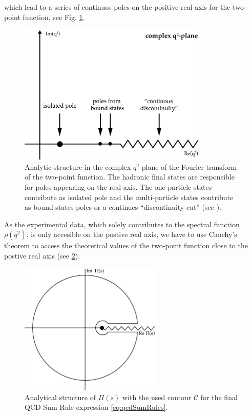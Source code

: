 \documentclass[../../index.tex]{subfiles}
\begin{document}
which lead to a series of continuos poles on the positive real axis for the
two-point function, see Fig. \ref{fig:analyticStructureCorrelator}.
\begin{figure}[h]
  \centering
  \label{fig:analyticStructureCorrelator}
  \includegraphics[width=0.8\textwidth]{./images/analyticStructureCorrelator.eps}
  \caption{Analytic structure in the complex $q^2$-plane of the Fourier
    transform of the two-point function. The hadronic final states are
    responsible for poles appearing on the real-axis. The one-particle states contribute as
    isolated pole and the multi-particle states contribute as bound-states poles
    or a continues ``discontinuity cut'' (see \cite{Peskin1995}).}
\end{figure}
As the experimental data, which solely contributes to the spectral function
$\rho(q^2)$, is only accesible on the postive real axis, we have to use Cauchy's
theorem to access the theoretical values of the two-point function close to the
postive real axis (see \cref{fig:correlatorComplexContour}).
\begin{figure}[h]
  \centering
  \label{fig:correlatorComplexContour}
  \includegraphics[width=0.6\textwidth]{./images/correlatorComplexContour.eps}
  \caption{Analytical structure of $\Pi(s)$ with the used contour $\mathcal{C}$
    for the final QCD Sum Rule expression \cref{eq:qcdSumRules}.}
\end{figure}
\end{document}
